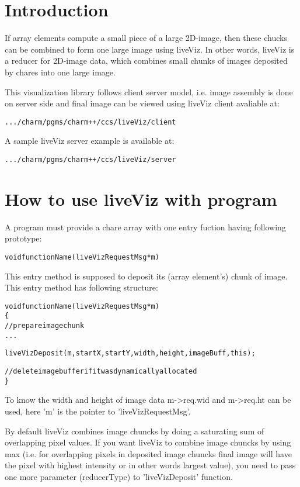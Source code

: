 \section{Introduction}

If array elements compute a small piece of a large 2D-image, then these 
chucks can be combined to form one large image using liveViz. In other 
words, liveViz is a reducer for 2D-image data, which combines small chunks
 of images deposited by chares into one large image.

This visualization library follows client server model, i.e. image 
assembly is done on server side and final image can be viewed using 
liveViz client avaliable at:
\begin{alltt}
           .../charm/pgms/charm++/ccs/liveViz/client
\end{alltt}

A sample liveViz server example is available at:
\begin{alltt}
           .../charm/pgms/charm++/ccs/liveViz/server
\end{alltt}

\section{How to use liveViz with \charmpp{} program}

A program must provide a chare array with one entry fuction having 
following prototype:

\begin{alltt}
  void functionName (liveVizRequestMsg *m)
\end{alltt}

This entry method is supposed to deposit its (array element's) chunk of 
image. This entry method has following structure:

\begin{alltt}
  void functionName (liveVizRequestMsg *m)
  \{
    // prepare image chunk
       ...

    liveVizDeposit (m, startX, startY, width, height, imageBuff, this);

    // delete image buffer if it was dynamically allocated
  \}
\end{alltt}

To know the width and height of image data m->req.wid and m->req.ht can 
be used, here 'm' is the pointer to 'liveVizRequestMsg'. 

By default liveViz combines image chuncks by doing a saturating sum of 
overlapping pixel values. If you want liveViz to combine image chuncks by using 
max (i.e. for overlapping pixels in deposited image chuncks final image will 
have the pixel with highest intensity or in other words largest value), you need
to pass one more parameter (reducerType) to 'liveVizDeposit' function.

